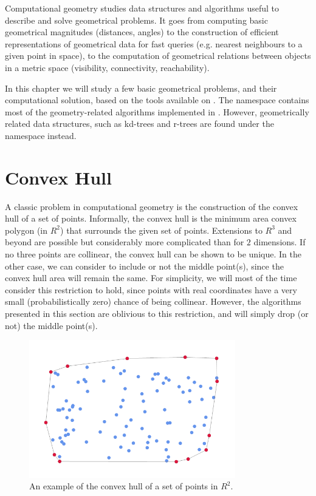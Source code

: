 Computational geometry studies data structures and algorithms
useful to describe and solve geometrical problems. It goes from
computing basic geometrical magnitudes (distances, angles)
to the construction of efficient representations of geometrical
data for fast queries (e.g. nearest neighbours to a given point in space),
to the computation of geometrical relations between objects in
a metric space (visibility, connectivity, reachability).

In this chapter we will study a few basic geometrical problems,
and their computational solution, based on the tools available
on \sct. The  namespace contains most of the 
geometry-related algorithms implemented in \sct. However, geometrically
related data structures, such as kd-trees and r-trees are found
under the  namespace instead.

\section{Convex Hull}\label{sec:convex-hull}

A
classic problem in computational geometry is the construction
of the convex hull of a set of points. Informally, the convex
hull is the minimum area convex polygon (in $R^2$) that surrounds the given set of points.
Extensions to $R^3$ and beyond are possible but considerably more complicated
than for $2$ dimensions.
If no three points are collinear, the convex hull
can be shown to be unique. In the other case, we can consider
to include or not the middle point(s), since the convex hull
area will remain the same. For simplicity, we will most of the time consider
this restriction to hold, since points with real coordinates
have a very small (probabilistically zero) chance of being collinear. 
However, the algorithms presented in this
section are oblivious to this restriction, and will simply drop (or not)
the middle point(s).

\begin{figure}
 \begin{center}
  \includegraphics[width=0.8\textwidth]{Graphics/ConvexHullExample}
 \end{center}
 \caption[Convex Hull Example]{An example of the convex hull of a set of points in $R^2$.}
\end{figure}

